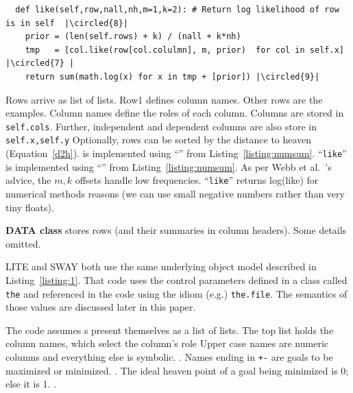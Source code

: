 \begin{listing}[!b]
\begin{verbatim}
  def like(self,row,nall,nh,m=1,k=2): # Return log likelihood of row is in self  |\circled{8}| 
    prior = (len(self.rows) + k) / (nall + k*nh)
    tmp   = [col.like(row[col.colulmn], m, prior)  for col in self.x] |\circled{7} |
    return sum(math.log(x) for x in tmp + [prior]) |\circled{9}|
\end{verbatim}
{\one} Rows arrive as list of lists. Row1 defines column names. Other rows are the examples.\newline
{\two} Column names define the roles of each column.\newline
{} Columns are stored in \verb+self.cols+.\newline
{} Further, independent and dependent columns are also store in \verb+self.x,self.y+\newline
{} Optionally, rows can be sorted by the distance to heaven (Equation~\ref{d2h}).\newline
{}  is implemented using ``'' from Listing~\ref{listing:numsum}.\newline
{} ``\texttt{like}'' is implemented using ``'' from Listing~\ref{listing:numsum}.\newline
{}  As per Webb et al.~\cite{yang2002comparative}'s advice,  the $m,k$ offsets handle low frequencies.   \newline
{} ``\texttt{like}'' returns log(like) for numerical methods reasons (we can use  small negative numbers rather than very tiny  floats).
\caption{{\bf DATA class} stores rows (and their summaries in column headers). Some details omitted.}
 
\label{listing:1}
\end{listing} 
    
 
LITE and SWAY both use the same underlying object model described in Listing~\ref{listing:1}.   That code uses  the control parameters defined in a class called  \verb+the+  and referenced in the code using
the idiom (e.g.) \verb+the.file+. The semantics of those values are discussed later in this paper.

The code assumes {\eg}s present themselves as a list of lists. The top list 
holds the column names,  which   select the column's role 
Upper case names are numeric columns and everything else is symbolic. .
Names ending in \verb_+-_ are goals to be maximized or minimized. .
The ideal heaven point of a goal being minimized is 0; else it is 1. .


